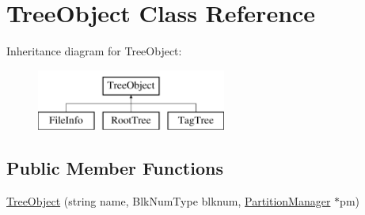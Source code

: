 \hypertarget{classTreeObject}{}\section{Tree\+Object Class Reference}
\label{classTreeObject}
Inheritance diagram for Tree\+Object\+:\begin{figure}[H]
\begin{center}
\leavevmode
\includegraphics[height=2.000000cm]{classTreeObject}
\end{center}
\end{figure}
\subsection*{Public Member Functions}
\begin{DoxyCompactItemize}
\item 
\mbox{\hyperlink{classTreeObject_a1ef90156e6b45ddef28c59a89cd1097d}{Tree\+Object}} (string name, Blk\+Num\+Type blknum, \mbox{\hyperlink{classPartitionManager}{Partition\+Manager}} $\ast$pm)
\end{DoxyCompactItemize}
